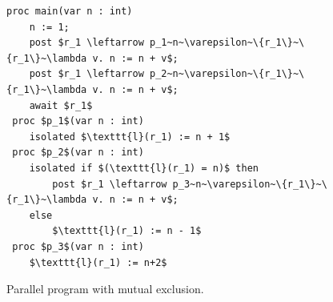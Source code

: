 \begin{figure}
  \begin{center}
    \begin{lstlisting}[mathescape=true]
  proc main(var n : int)
  	n := 1;
  	post $r_1 \leftarrow p_1~n~\varepsilon~\{r_1\}~\{r_1\}~\lambda v. n := n + v$;
  	post $r_1 \leftarrow p_2~n~\varepsilon~\{r_1\}~\{r_1\}~\lambda v. n := n + v$;
  	await $r_1$
 proc $p_1$(var n : int)
 	isolated $\texttt{l}(r_1) := n + 1$
 proc $p_2$(var n : int)
	isolated if $(\texttt{l}(r_1) = n)$ then
	  	post $r_1 \leftarrow p_3~n~\varepsilon~\{r_1\}~\{r_1\}~\lambda v. n := n + v$;
	else
		$\texttt{l}(r_1) := n - 1$
 proc $p_3$(var n : int)
	$\texttt{l}(r_1) := n+2$
\end{lstlisting}
  \end{center}
  \caption{Parallel program with mutual exclusion.}
  \label{fig:hj-isolated}
\end{figure}

